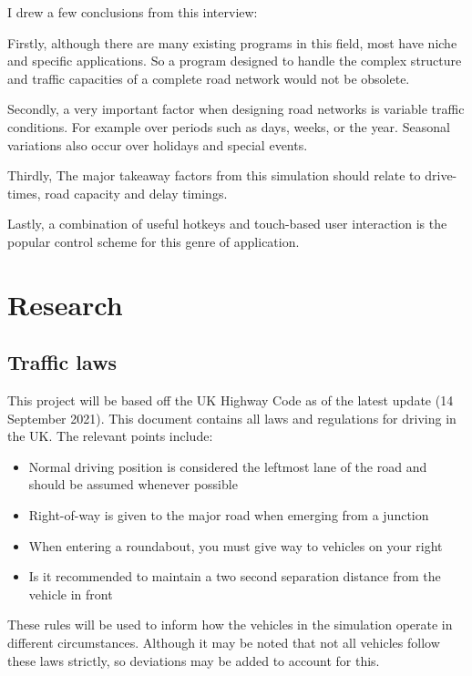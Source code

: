     I drew a few conclusions from this interview:

    Firstly, although there are many existing programs in this field, most have niche and specific applications. So a program designed to handle the complex structure and traffic capacities of a complete road network would not be obsolete.

    Secondly, a very important factor when designing road networks is variable traffic conditions. For example over periods such as days, weeks, or the year. Seasonal variations also occur over holidays and special events.

    Thirdly, The major takeaway factors from this simulation should relate to drive-times, road capacity and delay timings.

    Lastly, a combination of useful hotkeys and touch-based user interaction is the popular control scheme for this genre of application.

\section{Research}

    \subsection{Traffic laws}

        This project will be based off the UK Highway Code \cite{Highway-Code} as of the latest update (14 September 2021). This document contains all laws and regulations for driving in the UK. The relevant points include:

        \begin{itemize}
            \item Normal driving position is considered the leftmost lane of the road and should be assumed whenever possible
            \item Right-of-way is given to the major road when emerging from a junction
            \item When entering a roundabout, you must give way to vehicles on your right
            \item Is it recommended to maintain a two second separation distance from the vehicle in front
        \end{itemize}

        These rules will be used to inform how the vehicles in the simulation operate in different circumstances. Although it may be noted that not all vehicles follow these laws strictly, so deviations may be added to account for this.

